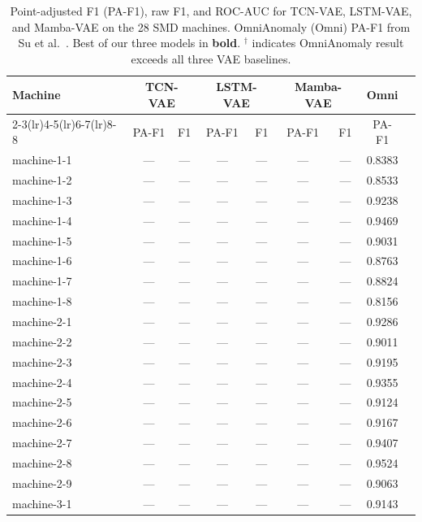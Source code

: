 \documentclass[10pt,twocolumn]{article}
\begin{document}
\begin{table}[t]
\centering
\caption{%
  Point-adjusted F1 (PA-F1), raw F1, and ROC-AUC for TCN-VAE, LSTM-VAE,
  and Mamba-VAE on the 28 SMD machines.
  OmniAnomaly (Omni) PA-F1 from Su et al.~\cite{su2019robust}.
  Best of our three models in \textbf{bold}.
  $^\dagger$ indicates OmniAnomaly result exceeds all three VAE baselines.
}
\label{tab:main_results}
\small
\begin{tabular}{lcccccccc}
\toprule
\multirow{2}{*}{Machine}
  & \multicolumn{2}{c}{TCN-VAE}
  & \multicolumn{2}{c}{LSTM-VAE}
  & \multicolumn{2}{c}{Mamba-VAE}
  & \multicolumn{1}{c}{Omni}
  \\
\cmidrule(lr){2-3}\cmidrule(lr){4-5}\cmidrule(lr){6-7}\cmidrule(lr){8-8}
  & PA-F1 & F1 & PA-F1 & F1 & PA-F1 & F1 & PA-F1 \\
\midrule
machine-1-1  & --- & --- & --- & --- & --- & --- & 0.8383 \\
machine-1-2  & --- & --- & --- & --- & --- & --- & 0.8533 \\
machine-1-3  & --- & --- & --- & --- & --- & --- & 0.9238 \\
machine-1-4  & --- & --- & --- & --- & --- & --- & 0.9469 \\
machine-1-5  & --- & --- & --- & --- & --- & --- & 0.9031 \\
machine-1-6  & --- & --- & --- & --- & --- & --- & 0.8763 \\
machine-1-7  & --- & --- & --- & --- & --- & --- & 0.8824 \\
machine-1-8  & --- & --- & --- & --- & --- & --- & 0.8156 \\
machine-2-1  & --- & --- & --- & --- & --- & --- & 0.9286 \\
machine-2-2  & --- & --- & --- & --- & --- & --- & 0.9011 \\
machine-2-3  & --- & --- & --- & --- & --- & --- & 0.9195 \\
machine-2-4  & --- & --- & --- & --- & --- & --- & 0.9355 \\
machine-2-5  & --- & --- & --- & --- & --- & --- & 0.9124 \\
machine-2-6  & --- & --- & --- & --- & --- & --- & 0.9167 \\
machine-2-7  & --- & --- & --- & --- & --- & --- & 0.9407 \\
machine-2-8  & --- & --- & --- & --- & --- & --- & 0.9524 \\
machine-2-9  & --- & --- & --- & --- & --- & --- & 0.9063 \\
machine-3-1  & --- & --- & --- & --- & --- & --- & 0.9143 \\

\end{tabular}
\end{table}
\end{document}
